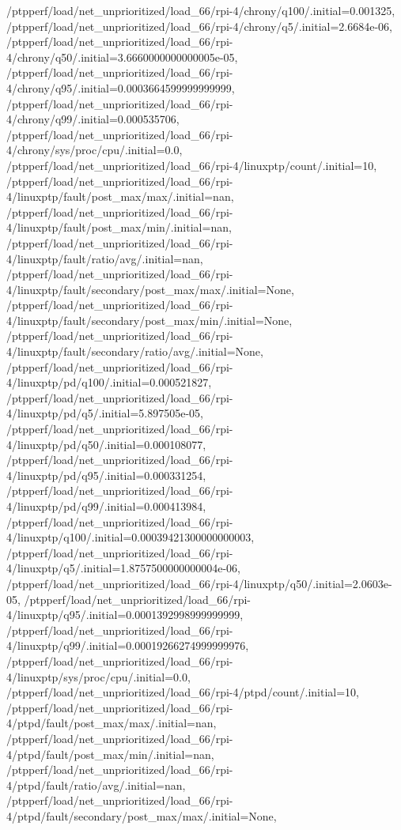 {    /ptpperf/load/net_unprioritized/load_66/rpi-4/chrony/q100/.initial=0.001325,
    /ptpperf/load/net_unprioritized/load_66/rpi-4/chrony/q5/.initial=2.6684e-06,
    /ptpperf/load/net_unprioritized/load_66/rpi-4/chrony/q50/.initial=3.6660000000000005e-05,
    /ptpperf/load/net_unprioritized/load_66/rpi-4/chrony/q95/.initial=0.0003664599999999999,
    /ptpperf/load/net_unprioritized/load_66/rpi-4/chrony/q99/.initial=0.000535706,
    /ptpperf/load/net_unprioritized/load_66/rpi-4/chrony/sys/proc/cpu/.initial=0.0,
    /ptpperf/load/net_unprioritized/load_66/rpi-4/linuxptp/count/.initial=10,
    /ptpperf/load/net_unprioritized/load_66/rpi-4/linuxptp/fault/post_max/max/.initial=nan,
    /ptpperf/load/net_unprioritized/load_66/rpi-4/linuxptp/fault/post_max/min/.initial=nan,
    /ptpperf/load/net_unprioritized/load_66/rpi-4/linuxptp/fault/ratio/avg/.initial=nan,
    /ptpperf/load/net_unprioritized/load_66/rpi-4/linuxptp/fault/secondary/post_max/max/.initial=None,
    /ptpperf/load/net_unprioritized/load_66/rpi-4/linuxptp/fault/secondary/post_max/min/.initial=None,
    /ptpperf/load/net_unprioritized/load_66/rpi-4/linuxptp/fault/secondary/ratio/avg/.initial=None,
    /ptpperf/load/net_unprioritized/load_66/rpi-4/linuxptp/pd/q100/.initial=0.000521827,
    /ptpperf/load/net_unprioritized/load_66/rpi-4/linuxptp/pd/q5/.initial=5.897505e-05,
    /ptpperf/load/net_unprioritized/load_66/rpi-4/linuxptp/pd/q50/.initial=0.000108077,
    /ptpperf/load/net_unprioritized/load_66/rpi-4/linuxptp/pd/q95/.initial=0.000331254,
    /ptpperf/load/net_unprioritized/load_66/rpi-4/linuxptp/pd/q99/.initial=0.000413984,
    /ptpperf/load/net_unprioritized/load_66/rpi-4/linuxptp/q100/.initial=0.00039421300000000003,
    /ptpperf/load/net_unprioritized/load_66/rpi-4/linuxptp/q5/.initial=1.8757500000000004e-06,
    /ptpperf/load/net_unprioritized/load_66/rpi-4/linuxptp/q50/.initial=2.0603e-05,
    /ptpperf/load/net_unprioritized/load_66/rpi-4/linuxptp/q95/.initial=0.0001392998999999999,
    /ptpperf/load/net_unprioritized/load_66/rpi-4/linuxptp/q99/.initial=0.00019266274999999976,
    /ptpperf/load/net_unprioritized/load_66/rpi-4/linuxptp/sys/proc/cpu/.initial=0.0,
    /ptpperf/load/net_unprioritized/load_66/rpi-4/ptpd/count/.initial=10,
    /ptpperf/load/net_unprioritized/load_66/rpi-4/ptpd/fault/post_max/max/.initial=nan,
    /ptpperf/load/net_unprioritized/load_66/rpi-4/ptpd/fault/post_max/min/.initial=nan,
    /ptpperf/load/net_unprioritized/load_66/rpi-4/ptpd/fault/ratio/avg/.initial=nan,
    /ptpperf/load/net_unprioritized/load_66/rpi-4/ptpd/fault/secondary/post_max/max/.initial=None,
}
